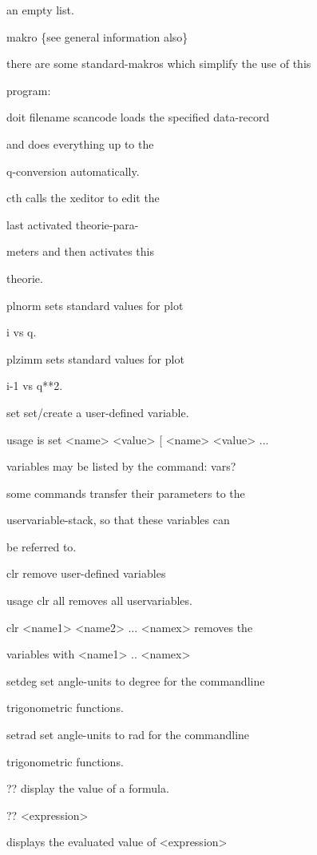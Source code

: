 \documentclass[]{article}
\begin{document}
an empty list.

makro \{see general information also\}

there are some standard-makros which simplify the use of this

program:

doit filename scancode loads the specified data-record

and does everything up to the

q-conversion automatically.

cth calls the xeditor to edit the

last activated theorie-para-

meters and then activates this

theorie.

plnorm sets standard values for plot

i vs q.

plzimm sets standard values for plot

i-1 vs q**2.

set set/create a user-defined variable.

usage is set \textless{}name\textgreater{}
\textless{}value\textgreater{} {[} \textless{}name\textgreater{}
\textless{}value\textgreater{} ...

variables may be listed by the command: vars?

some commands transfer their parameters to the

uservariable-stack, so that these variables can

be referred to.

clr remove user-defined variables

usage clr all removes all uservariables.

clr \textless{}name1\textgreater{} \textless{}name2\textgreater{} ...
\textless{}namex\textgreater{} removes the

variables with \textless{}name1\textgreater{} ..
\textless{}namex\textgreater{}

setdeg set angle-units to degree for the commandline

trigonometric functions.

setrad set angle-units to rad for the commandline

trigonometric functions.

?? display the value of a formula.

?? \textless{}expression\textgreater{}

displays the evaluated value of \textless{}expression\textgreater{}
\end{document}
